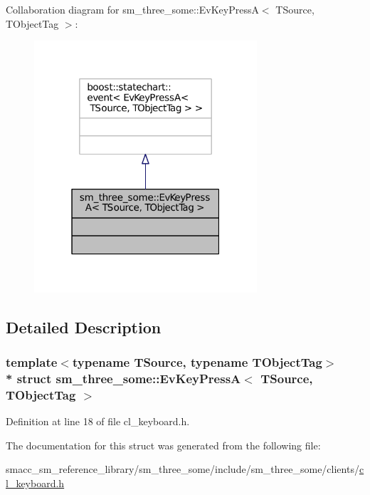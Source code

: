 Collaboration diagram for sm\+\_\+three\+\_\+some\+:\+:Ev\+Key\+PressA$<$ T\+Source, T\+Object\+Tag $>$\+:
\nopagebreak
\begin{figure}[H]
\begin{center}
\leavevmode
\includegraphics[width=235pt]{structsm__three__some_1_1EvKeyPressA__coll__graph}
\end{center}
\end{figure}


\subsection{Detailed Description}
\subsubsection*{template$<$typename T\+Source, typename T\+Object\+Tag$>$\\*
struct sm\+\_\+three\+\_\+some\+::\+Ev\+Key\+Press\+A$<$ T\+Source, T\+Object\+Tag $>$}



Definition at line 18 of file cl\+\_\+keyboard.\+h.



The documentation for this struct was generated from the following file\+:\begin{DoxyCompactItemize}
\item 
smacc\+\_\+sm\+\_\+reference\+\_\+library/sm\+\_\+three\+\_\+some/include/sm\+\_\+three\+\_\+some/clients/\hyperlink{cl__keyboard_8h}{cl\+\_\+keyboard.\+h}\end{DoxyCompactItemize}
